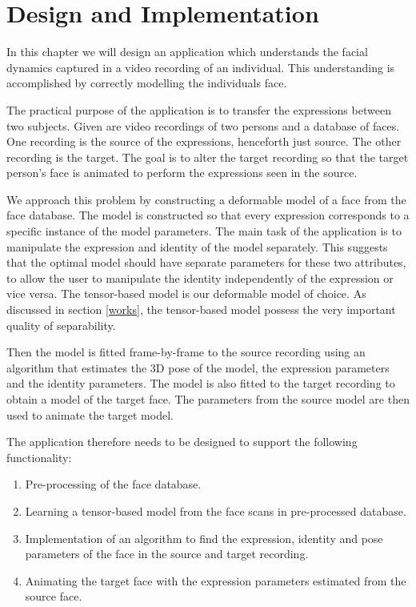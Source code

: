 \documentclass[11pt,a4paper]{report}
\begin{document}
\chapter{Design and Implementation}\label{design}
In this chapter we will design an application which understands the facial
dynamics captured in a video recording of an individual. This understanding is
accomplished by correctly modelling the individuals face.

The practical purpose of the application is to transfer the expressions between two
subjects. Given are video recordings of two persons and a database of
faces. One recording is the source of the expressions, henceforth just source. The
other recording is the target. The goal is to alter the target recording so that
the target person's face is animated to perform the expressions seen in the
source.

We approach this problem by constructing a deformable model of a face from the
face database. The model is constructed so that every expression corresponds to a specific instance of the model
parameters. The main task of the application is to manipulate the expression and
identity of the model separately. This suggests that the optimal model should have
separate parameters for these two attributes, to allow the user to manipulate
the identity independently of the expression or vice versa.
The tensor-based model is our deformable model of choice. As discussed in
section \ref{works}, the tensor-based model possess the very
important quality of separability.

Then the model is fitted frame-by-frame to the source recording using an
algorithm that estimates the 3D pose of the model, the expression parameters and
the identity parameters. The model is also fitted to the target recording to obtain a model of the target face. The
parameters from the source model are then used to animate the target model.

The application therefore needs to be designed to support the following functionality:

\begin{enumerate}
\item Pre-processing of the face database.
\item Learning a tensor-based model from the face scans in pre-processed database.
\item Implementation of an algorithm to find the expression, identity and pose
  parameters of the face in the source and target recording.
\item Animating the target face with the expression parameters estimated from
  the source face.
\end{enumerate}
\end{document}
